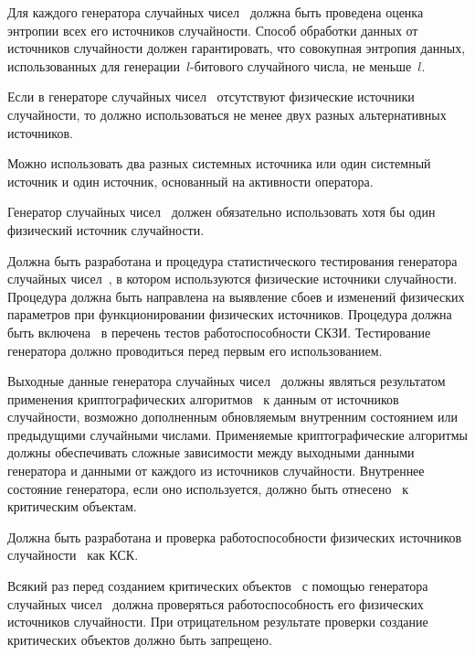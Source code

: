 \label{R.RN.Entropy}
Для каждого генератора случайных чисел~ должна быть проведена
оценка энтропии всех его источников случайности.
%
Способ обработки данных от источников случайности должен гарантировать, что
совокупная энтропия данных, использованных для генерации~$l$-битового случайного
числа, не меньше~$l$.

\label{R.RN.Source1}
Если в генераторе случайных чисел~ отсутствуют физические
источники случайности, то должно использоваться не менее двух разных
альтернативных источников.

\begin{note*}
Можно использовать два разных системных источника или один системный источник и
один источник, основанный на активности оператора.
\end{note*}

\label{R.RN.Source2}
Генератор случайных чисел~ должен обязательно использовать
хотя бы один физический источник случайности.

\label{R.RN.Tests}
Должна быть разработана и  процедура статистического
тестирования генератора случайных чисел~, в котором
используются физические источники случайности.
%
Процедура должна быть направлена на выявление сбоев и изменений физических
параметров при функционировании физических источников.
%
Процедура должна быть включена~ в перечень тестов 
работоспособности СКЗИ. Тестирование генератора должно проводиться перед 
первым его использованием. 

\label{R.RN.Crypto}
Выходные данные генератора случайных чисел~
должны являться результатом применения криптографических 
алгоритмов~ к данным от источников случайности, 
возможно дополненным обновляемым внутренним состоянием
или предыдущими случайными числами.
%
Применяемые криптографические алгоритмы должны 
обеспечивать сложные зависимости между выходными данными генератора и 
данными от каждого из источников случайности.
%
Внутреннее состояние генератора, если оно используется,
должно быть отнесено~ к критическим объектам.

\label{R.RN.TotTest}
%
Должна быть разработана и  проверка 
работоспособности физических источников случайности~ 
как КСК.

\label{R.RN.GenCrit}
Всякий раз перед созданием критических объектов~ 
с помощью генератора случайных чисел~ должна проверяться
работоспособность его физических источников случайности. 
%
При отрицательном результате проверки создание критических объектов должно быть 
запрещено.
